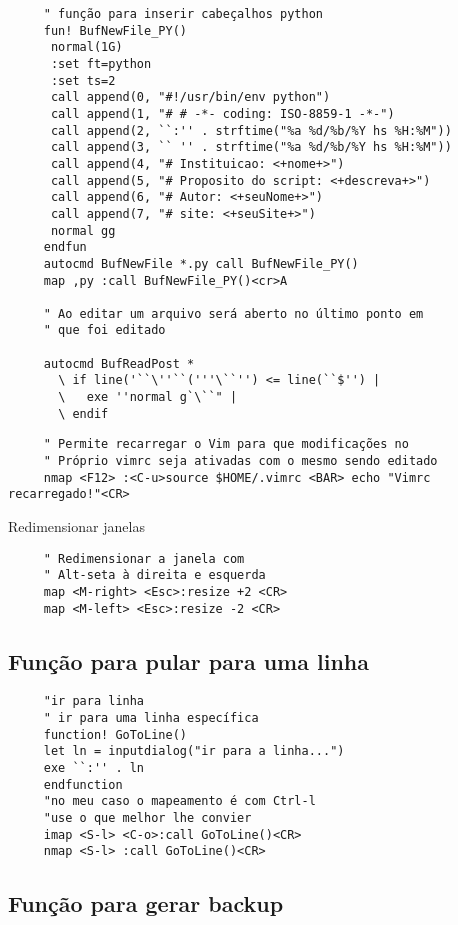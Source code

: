 \begin{verbatim}
     " função para inserir cabeçalhos python
     fun! BufNewFile_PY()
      normal(1G)
      :set ft=python
      :set ts=2
      call append(0, "#!/usr/bin/env python")
      call append(1, "# # -*- coding: ISO-8859-1 -*-")
      call append(2, ``:'' . strftime("%a %d/%b/%Y hs %H:%M"))
      call append(3, `` '' . strftime("%a %d/%b/%Y hs %H:%M"))
      call append(4, "# Instituicao: <+nome+>")
      call append(5, "# Proposito do script: <+descreva+>")
      call append(6, "# Autor: <+seuNome+>")
      call append(7, "# site: <+seuSite+>")
      normal gg
     endfun
     autocmd BufNewFile *.py call BufNewFile_PY()
     map ,py :call BufNewFile_PY()<cr>A
   
     " Ao editar um arquivo será aberto no último ponto em
     " que foi editado
   
     autocmd BufReadPost *
       \ if line('``\''``('''\``'') <= line(``$'') |
       \   exe ''normal g`\``" |
       \ endif
\end{verbatim}

\begin{verbatim}
     " Permite recarregar o Vim para que modificações no
     " Próprio vimrc seja ativadas com o mesmo sendo editado
     nmap <F12> :<C-u>source $HOME/.vimrc <BAR> echo "Vimrc recarregado!"<CR>
\end{verbatim}

Redimensionar janelas

\begin{verbatim}
     " Redimensionar a janela com
     " Alt-seta à direita e esquerda
     map <M-right> <Esc>:resize +2 <CR>
     map <M-left> <Esc>:resize -2 <CR>
\end{verbatim}

\subsection{Função para pular para uma linha}
\label{Função para pular para uma linha}

\begin{verbatim}
     "ir para linha
     " ir para uma linha específica
     function! GoToLine()
     let ln = inputdialog("ir para a linha...")
     exe ``:'' . ln
     endfunction
     "no meu caso o mapeamento é com Ctrl-l
     "use o que melhor lhe convier
     imap <S-l> <C-o>:call GoToLine()<CR>
     nmap <S-l> :call GoToLine()<CR>
\end{verbatim}

\subsection{Função para gerar backup}
\label{Função para gerar backup}


